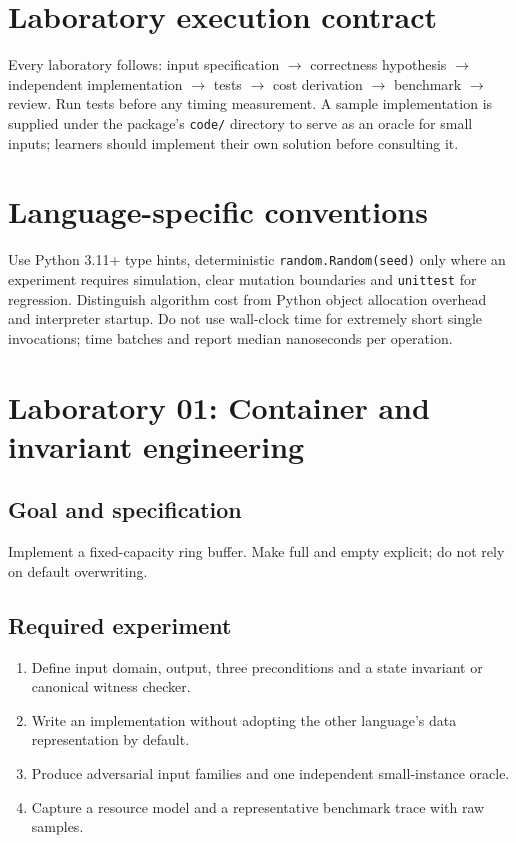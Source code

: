 \documentclass[11pt,letterpaper]{article}
\begin{document}
\tableofcontents
\clearpage
{}
\section{Laboratory execution contract}
Every laboratory follows: input specification $\rightarrow$ correctness hypothesis $\rightarrow$ independent implementation $\rightarrow$ tests $\rightarrow$ cost derivation $\rightarrow$ benchmark $\rightarrow$ review. Run tests before any timing measurement. A sample implementation is supplied under the package's \texttt{code/} directory to serve as an oracle for small inputs; learners should implement their own solution before consulting it.
\section{Language-specific conventions}

Use Python 3.11+ type hints, deterministic \texttt{random.Random(seed)} only where an experiment requires simulation, clear mutation boundaries and \texttt{unittest} for regression. Distinguish algorithm cost from Python object allocation overhead and interpreter startup. Do not use wall-clock time for extremely short single invocations; time batches and report median nanoseconds per operation.
\section{Laboratory 01: Container and invariant engineering}
\subsection{Goal and specification}
Implement a fixed-capacity ring buffer. Make full and empty explicit; do not rely on default overwriting.
\subsection{Required experiment}
\begin{enumerate}
\item Define input domain, output, three preconditions and a state invariant or canonical witness checker.
\item Write an implementation without adopting the other language's data representation by default.
\item Produce adversarial input families and one independent small-instance oracle.
\item Capture a resource model and a representative benchmark trace with raw samples.
\end{enumerate}
\end{document}
